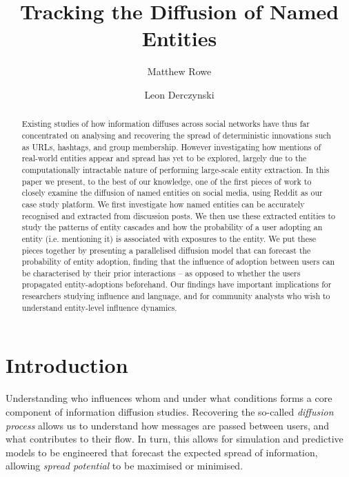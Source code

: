 \documentclass[sigconf,anonymous,review]{acmart}
\begin{document}
\title{Tracking the Diffusion of Named Entities}
\author{Matthew Rowe}
\author{Leon Derczynski}


\begin{abstract}
Existing studies of how information diffuses across social networks have thus far concentrated on analysing and recovering the spread of deterministic innovations such as URLs, hashtags, and group membership.
However investigating how mentions of real-world entities appear and spread has yet to be explored, largely due to the computationally intractable nature of performing large-scale entity extraction.
In this paper we present, to the best of our knowledge, one of the first pieces of work to closely examine the diffusion of named entities on social media, using Reddit as our case study platform.
We first investigate how named entities can be accurately recognised and extracted from discussion posts. %
We then use these extracted entities to study the patterns of entity cascades and how the probability of a user adopting an entity (i.e. mentioning it) is associated with exposures to the entity.
We put these pieces together by presenting a parallelised diffusion model that can forecast the probability of entity adoption, finding that the influence of adoption between users can be characterised by their prior interactions -- as opposed to whether the users propagated entity-adoptions beforehand.
Our findings have important implications for researchers studying influence and language, and for community analysts who wish to understand entity-level influence dynamics.
\end{abstract}



\maketitle






\section{Introduction}\label{sec:introduction}
Understanding who influences whom and under what conditions forms a core component of information diffusion studies.
Recovering the so-called \emph{diffusion process} allows us to understand how messages are passed between users, and what contributes to their flow.
In turn, this allows for simulation and predictive models to be engineered that forecast the expected spread of information, allowing \emph{spread potential} to be maximised or minimised.
\end{document}
